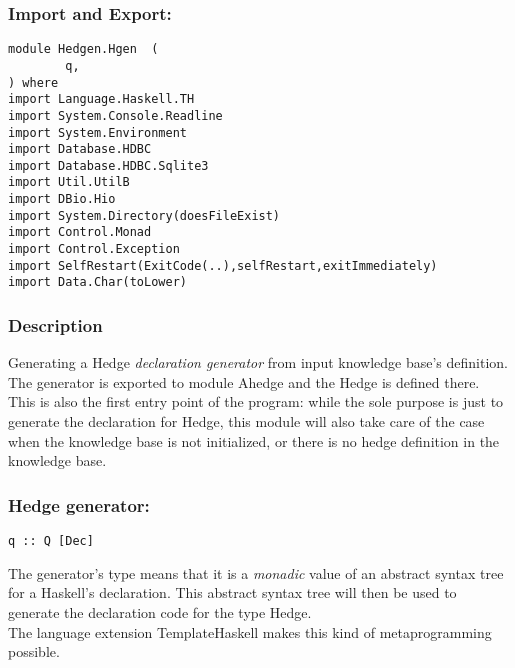 \documentclass[../gr-final.tex]{subfiles}
\begin{document}
\subsubsection{Import and Export:}

\begin{lstlisting}
module Hedgen.Hgen  (
        q,
) where
import Language.Haskell.TH
import System.Console.Readline
import System.Environment
import Database.HDBC
import Database.HDBC.Sqlite3
import Util.UtilB
import DBio.Hio
import System.Directory(doesFileExist)
import Control.Monad
import Control.Exception
import SelfRestart(ExitCode(..),selfRestart,exitImmediately)
import Data.Char(toLower) 
\end{lstlisting}        
\subsubsection {Description} Generating a Hedge {\em declaration generator} from input knowledge
base's definition. The generator is exported to module Ahedge and
the Hedge is defined there.\\
This is also the first entry point of the program: while the sole
purpose is just to generate the declaration for Hedge, this
module will also take care of the case when the knowledge base is
not initialized, or there is no hedge definition in the knowledge
base.
\subsubsection{Hedge generator:}
\begin{lstlisting}
q :: Q [Dec]
\end{lstlisting}
The generator's type means that it is a {\em monadic} value of
an abstract syntax tree for a Haskell's declaration. This
abstract syntax tree will then be used to generate the
declaration code for the type Hedge.\\
The language extension TemplateHaskell makes this kind of metaprogramming
possible.
\end{document}
